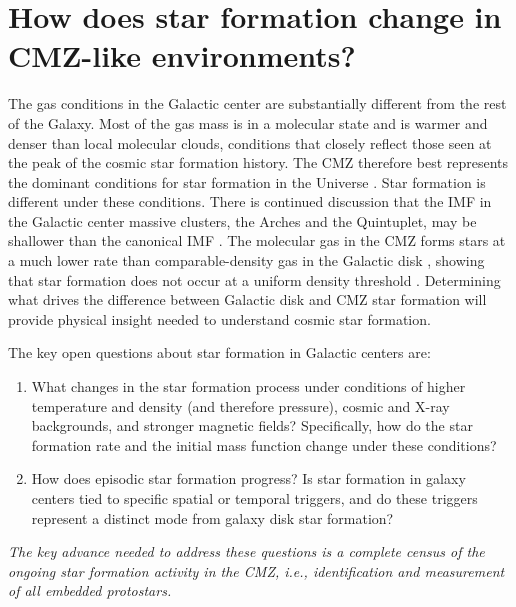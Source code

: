 \documentclass[modern]{aastex62}
\begin{document}
\section{How does star formation change in CMZ-like environments?}
The gas conditions in the Galactic center are substantially different from the
rest of the Galaxy.  Most of the gas mass is in a molecular state
\citep[][]{Kennicutt2012a,Mills2017a} and is warmer and denser than local
molecular clouds, conditions that closely reflect those seen at the peak of the
cosmic star formation history.  The CMZ therefore best represents the dominant
conditions for star formation in the Universe \citep{Kruijssen2013a}.  Star
formation is different under these conditions.  There is continued discussion
that the IMF in the Galactic center massive clusters, the Arches and the
Quintuplet, may be shallower than the canonical IMF \citep{Hosek2019a}. The
molecular gas in the CMZ forms stars at a much lower rate than
comparable-density gas in the Galactic disk \citep{Longmore2013b}, showing that
star formation does not occur at a uniform density threshold
\citep{Kruijssen2014c,Rathborne2014b,Barnes2017b,Walker2018a,Ginsburg2018a}.
Determining what drives the difference between Galactic disk and CMZ
star formation will provide physical insight needed to understand
cosmic star formation.

The key open questions about star formation in Galactic centers are:
\begin{enumerate}
    \item What changes in the star formation process under conditions
        of higher temperature and density (and therefore pressure), 
        cosmic and X-ray backgrounds, and stronger magnetic fields?
        Specifically, how do the star formation rate and the initial
        mass function change under these conditions?
    \item How does episodic star formation progress?  Is star formation
        in galaxy centers tied to specific spatial or temporal triggers,
        and do these triggers represent a distinct mode from galaxy disk star
        formation?
\end{enumerate}


{\it
The key advance needed to address these questions is a complete census of the
ongoing star formation activity in the CMZ, i.e., identification and measurement
of all embedded protostars.}
\end{document}
